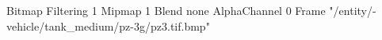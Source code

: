 {Bitmap
	{Filtering 1}
	{Mipmap 1}
	{Blend none}
	{AlphaChannel 0}
	{Frame "/entity/-vehicle/tank_medium/pz-3g/pz3.tif.bmp"}
}
